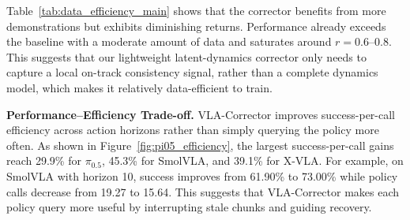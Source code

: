 Table~\ref{tab:data_efficiency_main} shows that the corrector benefits from more demonstrations but exhibits diminishing returns. Performance already exceeds the baseline with a moderate amount of data and saturates around $r=0.6$--$0.8$. This suggests that our lightweight latent-dynamics corrector only needs to capture a local on-track consistency signal, rather than a complete dynamics model, which makes it relatively data-efficient to train.

\textbf{Performance--Efficiency Trade-off.}
VLA-Corrector improves success-per-call efficiency across action horizons rather than simply querying the policy more often. As shown in Figure~\ref{fig:pi05_efficiency}, the largest success-per-call gains reach 29.9\% for $\pi_{0.5}$, 45.3\% for SmolVLA, and 39.1\% for X-VLA. For example, on SmolVLA with horizon 10, success improves from 61.90\% to 73.00\% while policy calls decrease from 19.27 to 15.64. This suggests that VLA-Corrector makes each policy query more useful by interrupting stale chunks and guiding recovery.

